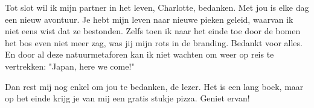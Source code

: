 Tot slot wil ik mijn partner in het leven, Charlotte, bedanken. Met jou is elke dag een nieuw avontuur. Je hebt mijn leven naar nieuwe pieken geleid, waarvan ik niet eens wist dat ze bestonden. Zelfs toen ik naar het einde toe door de bomen het bos even niet meer zag, was jij mijn rots in de branding. Bedankt voor alles. En door al deze natuurmetaforen kan ik niet wachten om weer op reis te vertrekken: "Japan, here we come!"

Dan rest mij nog enkel om jou te bedanken, de lezer. Het is een lang boek, maar op het einde krijg je van mij een gratis stukje pizza. Geniet ervan!

\cleardoublepage

